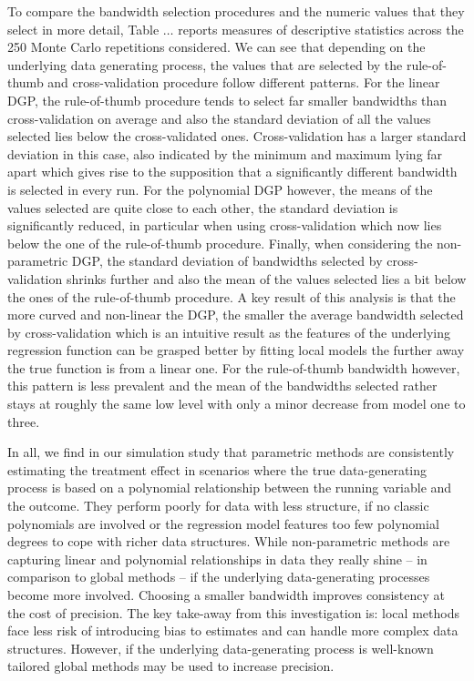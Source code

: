 To compare the bandwidth selection procedures and the numeric values that they select in more detail, Table $\dots$ reports measures of descriptive statistics across the 250 Monte Carlo repetitions considered. We can see that depending on the underlying data generating process, the values that are selected by the rule-of-thumb and cross-validation procedure follow different patterns. For the linear DGP, the rule-of-thumb procedure tends to select far smaller bandwidths than cross-validation on average and also the standard deviation of all the values selected lies below the cross-validated ones. Cross-validation has a larger standard deviation in this case, also indicated by the minimum and maximum lying far apart which gives rise to the supposition that a significantly different bandwidth is selected in every run. For the polynomial DGP however, the means of the values selected are quite close to each other, the standard deviation is significantly reduced, in particular when using cross-validation which now lies below the one of the rule-of-thumb procedure. Finally, when considering the non-parametric DGP, the standard deviation of bandwidths selected by cross-validation shrinks further and also the mean of the values selected lies a bit below the ones of the rule-of-thumb procedure. A key result of this analysis is that the more curved and non-linear the DGP, the smaller the average bandwidth selected by cross-validation which is an intuitive result as the features of the underlying regression function can be grasped better by fitting local models the further away the true function is from a linear one. For the rule-of-thumb bandwidth however, this pattern is less prevalent and the mean of the bandwidths selected rather stays at roughly the same low level with only a minor decrease from model one to three.

In all, we find in our simulation study that parametric methods are consistently estimating the treatment effect in scenarios where the true data-generating process is based on a polynomial relationship between the running variable and the outcome. They perform poorly for data with less structure, if no classic polynomials are involved or the regression model features too few polynomial degrees to cope with richer data structures. While non-parametric methods are capturing linear and polynomial relationships in data they really shine -- in comparison to global methods -- if the underlying data-generating processes become more involved. Choosing a smaller bandwidth improves consistency at the cost of precision. The key take-away from this investigation is: local methods face less risk of introducing bias to estimates and can handle more complex data structures. However, if the underlying data-generating process is well-known tailored global methods may be used to increase precision.











